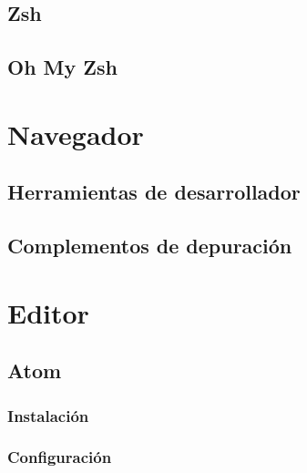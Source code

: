 \documentclass[a4paper,11pt,spanish]{sphinxmanual}
\begin{document}
\subsection{Zsh}
\label{\detokenize{introduccion-al-desarrollo-web:zsh}}

\subsection{Oh My Zsh}
\label{\detokenize{introduccion-al-desarrollo-web:oh-my-zsh}}

\section{Navegador}
\label{\detokenize{introduccion-al-desarrollo-web:navegador}}

\subsection{Herramientas de desarrollador}
\label{\detokenize{introduccion-al-desarrollo-web:herramientas-de-desarrollador}}

\subsection{Complementos de depuración}
\label{\detokenize{introduccion-al-desarrollo-web:complementos-de-depuracion}}

\section{Editor}
\label{\detokenize{introduccion-al-desarrollo-web:editor}}

\subsection{Atom}
\label{\detokenize{introduccion-al-desarrollo-web:atom}}

\subsubsection{Instalación}
\label{\detokenize{introduccion-al-desarrollo-web:instalacion}}

\subsubsection{Configuración}
\label{\detokenize{introduccion-al-desarrollo-web:configuracion}}
\end{document}
